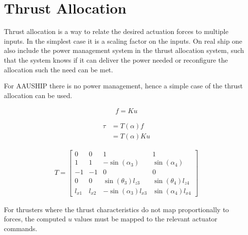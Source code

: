 \section{Thrust Allocation}
\label{sec:thrust_allocation}
Thrust allocation is a way to relate the desired actuation forces to multiple inputs. In the simplest case it is a scaling factor on the inputs. On real ship one also include the power management system in the thrust allocation system, such that the system knows if it can deliver the power needed or reconfigure the allocation such the need can be met.

For AAUSHIP there is no power management, hence a simple case of the thrust allocation can be used.

\begin{align}
f  = K u
\label{eq:fKu}
\end{align}

\begin{subequations}
\begin{align}
 \tau &=  T ( \alpha)  f\\
&=  T (  \alpha)  K  u
\end{align}
\end{subequations}

\begin{align}
T =
\begin{bmatrix}
0 & 0 & 1 & 1\\
1 & 1 & -\sin(\alpha_3) & \sin(\alpha_4)\\
-1 & -1 & 0 & 0\\
0 & 0 & \sin(\theta_3) l_{z3} & \sin(\theta_4)l_{z4} \\
l_{x1} & l_{x2} & -\sin(\alpha_3) l_{x3} & \sin(\alpha_4) l_{x4}
\end{bmatrix}
\end{align}
\citep{mss}


For thrusters where the thrust characteristics do not map
proportionally to forces, the computed $u$ values must be mapped
to the relevant actuator commands.

